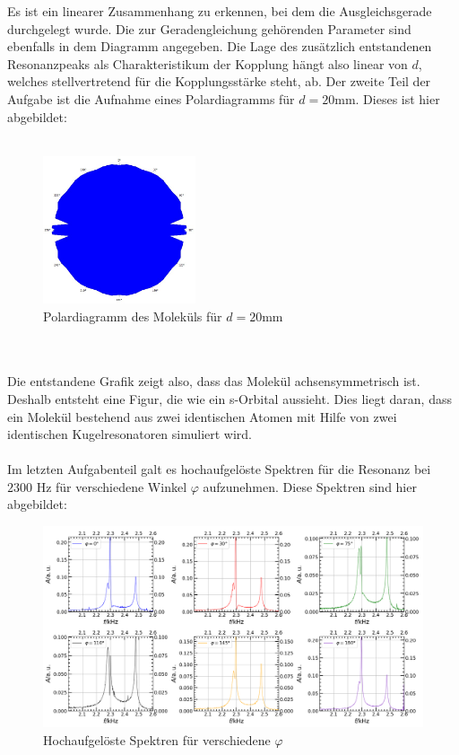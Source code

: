 \documentclass[german,  %
parskip=full,  %
]{scrartcl}
\begin{document}
Es ist ein linearer Zusammenhang zu erkennen, bei dem die Ausgleichsgerade durchgelegt wurde. Die zur Geradengleichung gehörenden Parameter sind ebenfalls in dem Diagramm angegeben. Die Lage des zusätzlich entstandenen Resonanzpeaks als Charakteristikum der Kopplung hängt also linear von $d$, welches stellvertretend für die Kopplungsstärke steht, ab.
\newline 
\newline Der zweite Teil der Aufgabe ist die Aufnahme eines Polardiagramms für $d=20$mm. Dieses ist hier abgebildet:
\\\\
\begin{figure}[h!]
\centering
\includegraphics[width=0.4\textwidth]{452.jpg}
\caption{Polardiagramm des Moleküls für $d=20$mm}
\end{figure}
\\\\
Die entstandene Grafik zeigt also, dass das Molekül achsensymmetrisch ist. Deshalb entsteht eine Figur, die wie ein s-Orbital aussieht. Dies liegt daran, dass ein Molekül bestehend aus zwei identischen Atomen mit Hilfe von zwei identischen Kugelresonatoren simuliert wird.
\\\\
Im letzten Aufgabenteil galt es hochaufgelöste Spektren für die Resonanz bei $2300$ Hz für verschiedene Winkel $\varphi$ aufzunehmen. Diese Spektren sind hier abgebildet:
\newpage
\begin{figure}[h!]
\centering
\includegraphics[width=\textwidth]{453.png}
\caption{Hochaufgelöste Spektren für verschiedene $\varphi$}
\end{figure}
\end{document}
